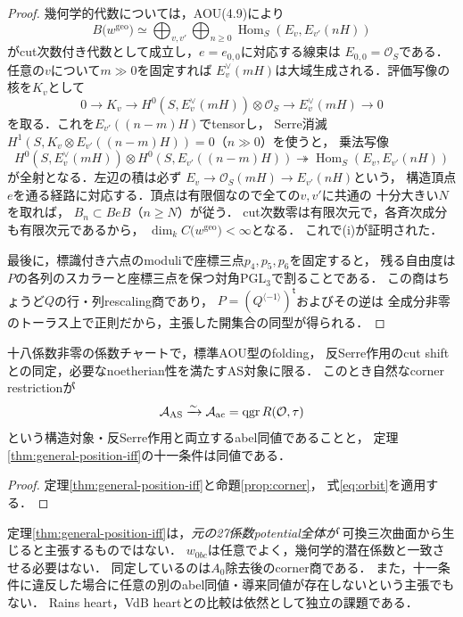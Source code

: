 \begin{proof}
幾何学的代数については，AOU(4.9)により
\begin{equation}\label{eq:geometric-rolled-orbit}
 B\bigl(w^{\mathrm{geo}}\bigr)
 \simeq\bigoplus_{v,v'}\bigoplus_{n\ge0}
 \operatorname{Hom}_S(E_v,E_{v'}(nH))
\end{equation}
がcut次数付き代数として成立し，$e=e_{0,0}$に対応する線束は
$E_{0,0}=\mathcal O_S$である．
任意の$v$について$m\gg0$を固定すれば
$E_v^\vee(mH)$は大域生成される．評価写像の核を$K_v$として
\[
 0\longrightarrow K_v\longrightarrow
 H^0(S,E_v^\vee(mH))\otimes\mathcal O_S
 \longrightarrow E_v^\vee(mH)\longrightarrow0
\]
を取る．これを$E_{v'}((n-m)H)$でtensorし，
Serre消滅$H^1(S,K_v\otimes E_{v'}((n-m)H))=0$（$n\gg0$）を使うと，
乗法写像
\begin{equation}\label{eq:serre-factorization}
 H^0(S,E_v^\vee(mH))\otimes
 H^0(S,E_{v'}((n-m)H))
 \twoheadrightarrow
 \operatorname{Hom}_S(E_v,E_{v'}(nH))
\end{equation}
が全射となる．左辺の積は必ず
$E_v\to\mathcal O_S(mH)\to E_{v'}(nH)$という，
構造頂点$e$を通る経路に対応する．頂点は有限個なので全ての$v,v'$に共通の
十分大きい$N$を取れば，
$B_n\subset BeB$（$n\ge N$）が従う．
cut次数零は有限次元で，各斉次成分も有限次元であるから，
$\dim_kC\bigl(w^{\mathrm{geo}}\bigr)<\infty$となる．
これで(i)が証明された．

最後に，標識付き六点のmoduliで座標三点$p_4,p_5,p_6$を固定すると，
残る自由度は$P$の各列のスカラーと座標三点を保つ対角$\mathrm{PGL}_3$で割ることである．
この商はちょうど$Q$の行・列rescaling商であり，
$P=(Q^{\langle-1\rangle})^{\mathsf t}$およびその逆は
全成分非零のトーラス上で正則だから，主張した開集合の同型が得られる．
\end{proof}

\begin{corollary}
\label{cor:complete-as-ac}
十八係数非零の係数チャートで，標準AOU型のfolding，
反Serre作用のcut shiftとの同定，必要なnoetherian性を満たすAS対象に限る．
このとき自然なcorner restrictionが
\[
 \mathcal A_{\mathrm{AS}}\xrightarrow{\sim}
 \mathcal A_{\mathrm{ac}}=\operatorname{qgr} R(\mathcal O,\tau)
\]
という構造対象・反Serre作用と両立するabel同値であることと，
定理\ref{thm:general-position-iff}の十一条件は同値である．
\end{corollary}
\begin{proof}
定理\ref{thm:general-position-iff}と命題\ref{prop:corner}，
式\eqref{eq:orbit}を適用する．
\end{proof}

\begin{remark}
定理\ref{thm:general-position-iff}は，\emph{元の27係数potential全体が}
可換三次曲面から生じると主張するものではない．
$w_{0bc}$は任意でよく，幾何学的潜在係数と一致させる必要はない．
同定しているのは$A_0$除去後のcorner商である．
また，十一条件に違反した場合に任意の別のabel同値・導来同値が存在しないという主張でもない．
Rains heart，VdB heartとの比較は依然として独立の課題である．
\end{remark}
